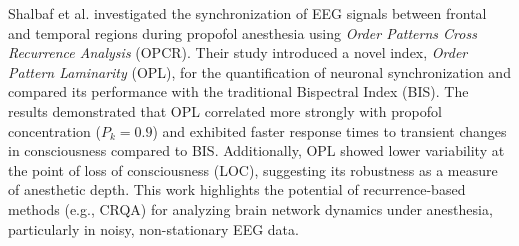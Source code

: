 \documentclass{article}
\begin{document}
			
			Shalbaf et al. \cite{shalbaf2014frontal} investigated the synchronization of EEG signals 
			between frontal and temporal regions during propofol anesthesia 
			using \textit{Order Patterns Cross Recurrence Analysis} (OPCR). 
			Their study introduced a novel index, \textit{Order Pattern Laminarity} (OPL), for the quantification of
			neuronal synchronization and compared its performance with the traditional Bispectral Index (BIS). 
			The results demonstrated that OPL correlated more strongly with propofol concentration 
			($P_k = 0.9$) and exhibited faster response times to transient changes in consciousness 
			compared to BIS. Additionally, OPL showed lower variability at the point of loss of 
			consciousness (LOC), suggesting its robustness as a measure of anesthetic depth. 
			This work highlights the potential of recurrence-based methods (e.g., CRQA) 
			for analyzing brain network dynamics under anesthesia, 
			particularly in noisy, non-stationary EEG data.






			
\end{document}
